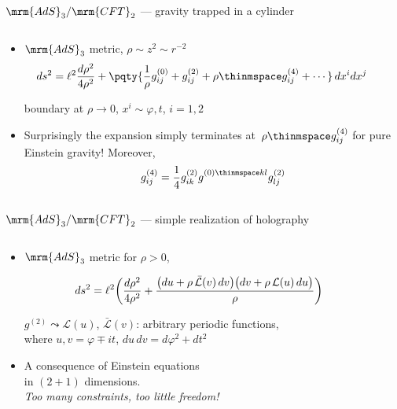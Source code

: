 \documentclass[
	10pt
	,noamsthm
]{beamer}
\begin{document}
\begin{frame}{$\mrm{AdS}_3/\mrm{CFT}_2$ --- gravity trapped in a cylinder}{%
	\textcite{Aharony:1999ti}
}
\begin{columns}
\figAdsCft
\begin{column}{.75\textwidth}
	\begin{itemize}
	\item $\mrm{AdS}_3$ metric, $\rho \sim z^2 \sim r^{-2}$
	\begin{equation}
	\hspace{-2em}
		ds^2 = \ell^2 \frac{d\rho^2}{4 \rho^2} + \pqty{\frac{1}{\rho} g^{(0)}_{ij} + g^{(2)}_{ij} + \rho\thinmspace g^{(4)}_{ij} + \cdots}\, dx^i dx^j \label{fggauge}
	\end{equation}
	
	\vspace{-.5\baselineskip}
	boundary at $\rho \to 0$, $x^{i} \sim \varphi, t$, $i = 1,2$

\pause
	\item Surprisingly the expansion simply terminates at~$\rho\thinmspace g^{(4)}_{ij}$ for pure Einstein gravity! Moreover,
	\begin{equation}
		g^{(4)}_{ij} = \frac{1}{4} g^{(2)}_{ik} g^{(0)\thinmspace kl}_{\phantom{kl}} g^{(2)}_{lj}
	\end{equation}
	\textcite{Fefferman:2007rka,Banados:1998gg}
	\end{itemize}
\end{column}
\end{columns}
\end{frame}

\newcommand{\eqBanados}{
	\begin{equation*}
	\hspace{-2em}
		ds^2 = \ell^2 \bigg( \frac{d\rho^2}{4 \rho^2} + \frac{ \big( du + \rho \, \mathcal {\bar L}(v)\, dv \big) \big( dv + \rho \, \mathcal L(u)\, du \big) }{\rho} \bigg)\ \,
	\end{equation*}
}

\begin{frame}{$\mrm{AdS}_3/\mrm{CFT}_2$ --- simple realization of holography}{%
	\textcite{Banados:1992wn}
}
\begin{columns}
\figAdsCft
\begin{column}{.72\textwidth}
	\begin{itemize}
	\item $\mrm{AdS}_3$ metric for $\rho > 0$, \\
	\textcite{Banados:1998gg}
	\eqBanados
	$g^{(2)} \leadsto \mathcal L(u)$, $\bar{\mathcal L}(v)$: arbitrary periodic functions,\\
	where $u,v = \varphi \mp it$, $du\,dv = d\varphi^2 + dt^2$
	
\pause
	\item A consequence of Einstein equations \\
	in $(2+1)$ dimensions.\\
	\textit{Too many constraints, too little freedom!}
	\end{itemize}
\end{column}
\end{columns}
\end{frame}
\end{document}
